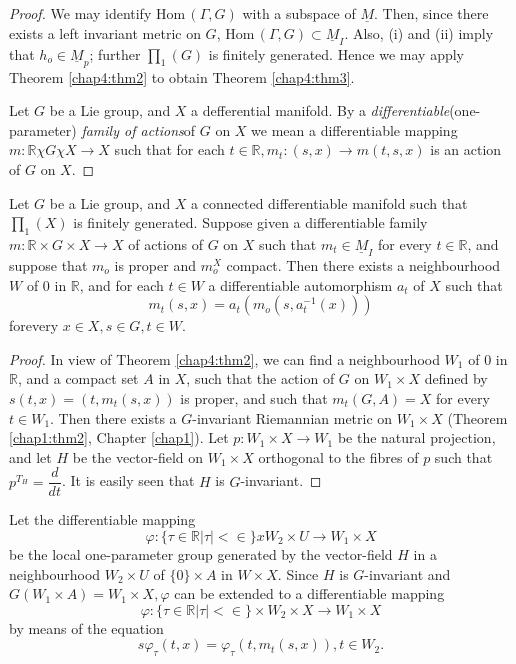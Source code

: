 \begin{proof}
  We may identify Hom\,$(\Gamma, G)$ with a subspace of
  $\underline{M}$. Then, since there exists a left invariant metric on
  $G$, Hom\,$(\Gamma,G) \subset \underline{M}_I$. Also, (i) and (ii)
  imply that $h_o \in \underline{M}_p$;  further $\prod_1(G)$  is
  finitely generated. Hence we may apply Theorem \ref{chap4:thm2} to obtain Theorem
  \ref{chap4:thm3}. 
  
  Let $G$ be a Lie group, and $X$  a defferential manifold. By a
  \textit{differentiable}(one-parameter) \textit{family of actions}of
  $G$ on $X$ we mean a differentiable mapping $m: \mathbb{R} 
  \chi G \chi X \to X$ such that for each  $t \in \mathbb{R},m_t:  (s,x)
  \rightarrow m(t,s,x)$ is an action of $G$ on $X$.  
\end{proof}

\begin{thm}\label{chap4:thm4}%
  Let $G$ be a Lie group, and $X$ a connected differentiable manifold
  such that $\prod_1(X)$ is finitely generated. Suppose given a
  differentiable  family  $m:\mathbb{R} \times G \times X \to
  X$ of actions  of $G$ on $X$ such that $m_t \in \underline{M}_I$ for
  every $t \in \mathbb{R}$, and suppose that  $m_o$   is proper and
  $m_o^X$ compact. Then there exists a neighbourhood $W$ of $0$ in
  $\mathbb{R}$, and for each $t  \in  W$ a differentiable  automorphism
  $a_t$ of $X$ such that 
  $$
  m_t(s,x)= a_t(m_o(s, a^{-1}_t(x)))
  $$
  for\pageoriginale every $x \in  X, s \in G, t  \in W$.
\end{thm}

\begin{proof}
  In view of Theorem \ref{chap4:thm2}, we can find a neighbourhood $W_1$ of $0$ in
  $\mathbb{R}$, and  a compact set $A$ in $X$, such that the action of
  $G$ on $W_1 \times X$ defined by $s(t,x)=(t,m_t(s,x))$ is proper, and
  such that $m_t(G,A)=X$ for every $t \in W_1$. Then there exists a
  $G$-invariant Riemannian metric on $W_1 \times X$ (Theorem
  \ref{chap1:thm2}, Chapter \ref{chap1}). Let $p: W_1 \times X \to
  W_1$ be the natural projection, and let $H$ 
  be the vector-field on $W_1 \times X$ orthogonal to the fibres of $p$
  such that $p^{T_H}= \dfrac{d}{dt}$.  It is easily seen that  $H$ is
  $G$-invariant. 
\end{proof}

Let the differentiable mapping
$$
\varphi: \bigg\{ \tau \in \mathbb{R}|\tau | < \in \bigg\} x W_2
\times U \to W_1 \times X 
$$
be the local one-parameter group generated by the vector-field $H$ in
a neighbourhood $W_2 \times U$ of $\{0\} \times A$ in $W \times
X$. Since $H$ is $G$-invariant and $G(W_1 \times A) =W_1 \times X,
\varphi$ can be extended to a differentiable mapping 
$$
\varphi : \{ \tau \in \mathbb{R}|\tau|< \in \} \times W_2 \times X
\to  W_1 \times X 
$$
by means of the equation
\begin{equation}
  s \varphi_\tau(t,x) = \varphi_\tau(t,m_t(s,x)), t \in W_2. \tag{*}
\end{equation} 

